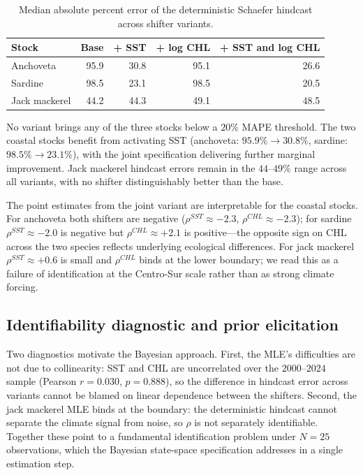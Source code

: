 \documentclass[
  11pt,
]{article}
\begin{document}
\begin{table}[!h]
\centering
\caption{\label{tab:stress-mape-table}Median absolute percent error of the deterministic Schaefer hindcast across shifter variants. \label{tab:stress-mape}}
\centering
\fontsize{10}{12}\selectfont
\begin{tabular}[t]{lrrrr}
\toprule
Stock & Base & + SST & + log CHL & + SST and log CHL\\
\midrule
Anchoveta & 95.9 & 30.8 & 95.1 & 26.6\\
Sardine & 98.5 & 23.1 & 98.5 & 20.5\\
Jack mackerel & 44.2 & 44.3 & 49.1 & 48.5\\
\bottomrule
\end{tabular}
\end{table}

No variant brings any of the three stocks below a \(20\%\) MAPE
threshold. The two coastal stocks benefit from activating SST
(anchoveta: \(95.9\%\to 30.8\%\), sardine: \(98.5\%\to 23.1\%\)), with
the joint specification delivering further marginal improvement.
Jack mackerel hindcast errors remain in the \(44\)--\(49\%\) range across
all variants, with no shifter distinguishably better than the base.

The point estimates from the joint variant are interpretable for the
coastal stocks. For anchoveta both shifters are negative
(\(\rho^{SST} \approx -2.3\), \(\rho^{CHL} \approx -2.3\)); for sardine
\(\rho^{SST} \approx -2.0\) is negative but \(\rho^{CHL} \approx +2.1\)
is positive---the opposite sign on CHL across
the two species reflects underlying ecological differences. For jack mackerel \(\rho^{SST} \approx +0.6\)
is small and \(\rho^{CHL}\) binds at the lower boundary; we read this
as a failure of identification at the Centro-Sur scale rather than as
strong climate forcing.

\subsection{Identifiability diagnostic and prior elicitation}\label{sec:appendix-stress-diag}

\label{sec:appendix-stress-priors}

Two diagnostics motivate the Bayesian approach. First, the MLE's
difficulties are not due to collinearity: SST and CHL are uncorrelated
over the \(2000\)--\(2024\) sample (Pearson \(r = 0.030\), \(p = 0.888\)), so
the difference in hindcast error across variants cannot be blamed on
linear dependence between the shifters. Second, the jack mackerel MLE binds
at the boundary: the deterministic hindcast cannot separate the climate
signal from noise, so \(\rho\) is not separately identifiable. Together
these point to a fundamental identification problem under \(N=25\)
observations, which the Bayesian state-space specification addresses
in a single estimation step.
\end{document}
